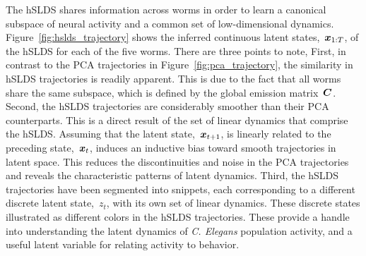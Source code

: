 \documentclass{article}
\begin{document}
The hSLDS shares information across worms in order to learn a
canonical subspace of neural activity and a common set of
low-dimensional dynamics. Figure~\ref{fig:hslds_trajectory} shows the
inferred continuous latent states,~$\boldsymbol{x}_{1:T}$, of the hSLDS for each
of the five worms. There are three points to note, First, in contrast
to the PCA trajectories in Figure~\ref{fig:pca_trajectory}, the
similarity in hSLDS trajectories is readily apparent. This is due to
the fact that all worms share the same subspace, which is defined by the
global emission matrix~$\boldsymbol{C}$. Second, the hSLDS trajectories
are considerably smoother than their PCA counterparts. This is a
direct result of the set of linear dynamics that comprise the hSLDS.
Assuming that the latent state,~$\boldsymbol{x}_{t+1}$, is linearly related to the
preceding state,~$\boldsymbol{x}_t$, induces an inductive bias toward smooth
trajectories in latent space. This reduces the discontinuities and noise
in the PCA trajectories and reveals the characteristic patterns of
latent dynamics. Third, the hSLDS trajectories have been segmented into
snippets, each corresponding to a different discrete latent state,~$z_t$, with
its own set of linear dynamics. These discrete states illustrated
as different colors in the hSLDS trajectories. These provide a
handle into understanding the latent dynamics of \textit{C. Elegans}
population activity, and a useful latent variable for relating
activity to behavior.
\end{document}
